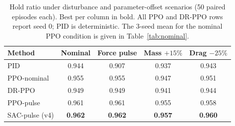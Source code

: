 \documentclass[conference]{IEEEtran}
\begin{document}
\begin{table}[t]
\centering
\caption{Hold ratio under disturbance and parameter-offset scenarios (50 paired episodes each). Best per column in bold. All PPO and DR-PPO rows report seed 0; PID is deterministic. The 3-seed mean for the nominal PPO condition is given in Table~\ref{tab:nominal}.}
\label{tab:robust}
\begin{tabular}{@{}lcccc@{}}
\toprule
\textbf{Method} & \textbf{Nominal} & \textbf{Force pulse} & \textbf{Mass $+15\%$} & \textbf{Drag $-25\%$} \\
\midrule
PID         & 0.944 & 0.907 & 0.937 & 0.943 \\
PPO-nominal & 0.955 & 0.955 & 0.947 & 0.951 \\
DR-PPO      & 0.949 & 0.949 & 0.941 & 0.944 \\
PPO-pulse   & 0.961 & 0.961 & 0.955 & 0.958 \\
SAC-pulse (v4) & \textbf{0.962} & \textbf{0.962} & \textbf{0.957} & \textbf{0.960} \\
\bottomrule
\end{tabular}
\end{table}
\end{document}
